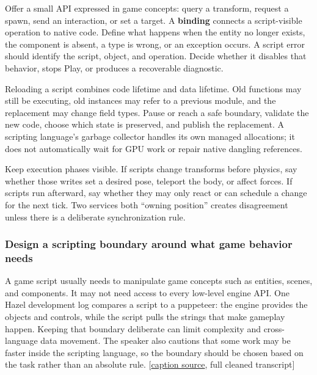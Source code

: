 Offer a small API expressed in game concepts: query a transform, request a spawn, send an interaction, or set a target. A \textbf{binding} connects a script-visible operation to native code. Define what happens when the entity no longer exists, the component is absent, a type is wrong, or an exception occurs. A script error should identify the script, object, and operation. Decide whether it disables that behavior, stops Play, or produces a recoverable diagnostic.

Reloading a script combines code lifetime and data lifetime. Old functions may still be executing, old instances may refer to a previous module, and the replacement may change field types. Pause or reach a safe boundary, validate the new code, choose which state is preserved, and publish the replacement. A scripting language's garbage collector handles its own managed allocations; it does not automatically wait for GPU work or repair native dangling references.

Keep execution phases visible. If scripts change transforms before physics, say whether those writes set a desired pose, teleport the body, or affect forces. If scripts run afterward, say whether they may only react or can schedule a change for the next tick. Two services both ``owning position'' creates disagreement unless there is a deliberate synchronization rule.

\subsubsection{Design a scripting boundary around what game behavior needs}\label{06-engine-ii-ch040-design-a-scripting-boundary-around-what-game-behavior-needs}

\hypertarget{06-engine-ii-ch040-design-a-scripting-boundary-around-what-game-behavior-needs}{}

A game script usually needs to manipulate game concepts such as entities, scenes, and components. It may not need access to every low-level engine API. One Hazel development log compares a script to a puppeteer: the engine provides the objects and controls, while the script pulls the strings that make gameplay happen. Keeping that boundary deliberate can limit complexity and cross-language data movement. The speaker also cautions that some work may be faster inside the scripting language, so the boundary should be chosen based on the task rather than an absolute rule. {[}\href{https://www.youtube.com/watch?v=ilqJfU3bUtM}{caption source}, full cleaned transcript{]}


